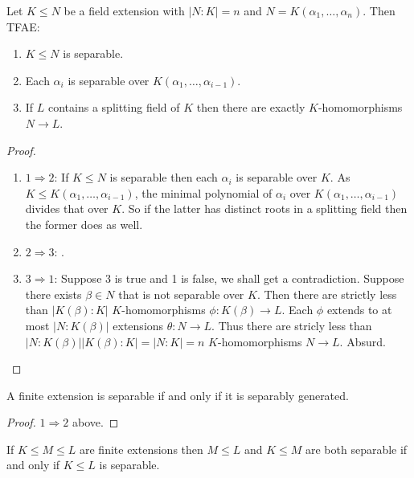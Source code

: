 \documentclass[a4paper]{article}
\begin{document}
\begin{theorem}
  Let \(K \leq N\) be a field extension with \(|N:K| = n\) and \(N = K(\alpha_1, \dots, \alpha_n)\). Then TFAE:
  \begin{enumerate}
  \item \(K \leq N\) is separable.
  \item Each \(\alpha_i\) is separable over \(K(\alpha_1, \dots, \alpha_{i - 1})\).
  \item If \(L\) contains a splitting field of \(K\) then there are exactly \(K\)-homomorphisms \(N \to L\).
  \end{enumerate}
\end{theorem}

\begin{proof}\leavevmode
  \begin{enumerate}
  \item \(1 \Rightarrow 2\): If \(K \leq N\) is separable then each \(\alpha_i\) is separable over \(K\). As \(K \leq K(\alpha_1, \dots, \alpha_{i - 1})\), the minimal polynomial of \(\alpha_i\) over \(K(\alpha_1, \dots, \alpha_{i - 1})\) divides that over \(K\). So if the latter has distinct roots in a splitting field then the former does as well.
  \item \(2 \Rightarrow 3\): .
  \item \(3 \Rightarrow 1\): Suppose 3 is true and 1 is false, we shall get a contradiction. Suppose there exists \(\beta \in N\) that is not separable over \(K\). Then there are strictly less than \(|K(\beta):K|\) \(K\)-homomorphisms \(\phi: K(\beta) \to L\). Each \(\phi\) extends to at most \(|N:K(\beta)|\) extensions \(\theta: N \to L\). Thus there are stricly less than \(|N:K(\beta)||K(\beta):K| = |N:K| = n\) \(K\)-homomorphisms \(N \to L\). Absurd.
  \end{enumerate}
\end{proof}

\begin{corollary}
  A finite extension is separable if and only if it is separably generated.
\end{corollary}

\begin{proof}
  \(1 \Rightarrow 2\) above.
\end{proof}

\begin{lemma}
  If \(K \leq M \leq L\) are finite extensions then \(M \leq L\) and \(K \leq M\) are both separable if and only if \(K \leq L\) is separable.
\end{lemma}
\end{document}

